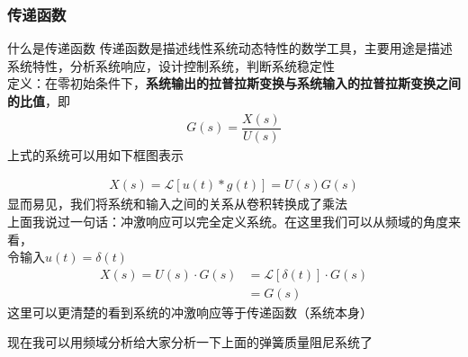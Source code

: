 \documentclass[UTF8,a4paper,12pt]{ctexart}
\begin{document}
    \subsubsection{传递函数}
    \begin{titlebox}{什么是传递函数}
      传递函数是描述线性系统动态特性的数学工具，主要用途是描述系统特性，分析系统响应，设计控制系统，判断系统稳定性
      \\定义：在零初始条件下，\textbf{系统输出的拉普拉斯变换与系统输入的拉普拉斯变换之间的比值}，即
      \begin{align*}
        G(s)=\dfrac{X(s)}{U(s)}
      \end{align*}
        上式的系统可以用如下框图表示\\
        \begin{center}
        \end{center}
        \begin{align*}
          X(s)=\mathcal{L}[u(t)*g(t)]=U(s)G(s)
        \end{align*}
     显而易见，我们将系统和输入之间的关系从卷积转换成了乘法
     {\scriptsize\\上面我说过一句话：冲激响应可以完全定义系统。在这里我们可以从频域的角度来看，
     \\令输入$u(t)=\delta (t)$
     \begin{align*}
      X(s)=U(s)\cdot G(s)&=\mathcal{L}[\delta (t)]\cdot G(s)\\
                         &=G(s)
     \end{align*}
     这里可以更清楚的看到系统的冲激响应等于传递函数（系统本身）}
              
    \end{titlebox}
    现在我可以用频域分析给大家分析一下上面的弹簧质量阻尼系统了
\end{document}
